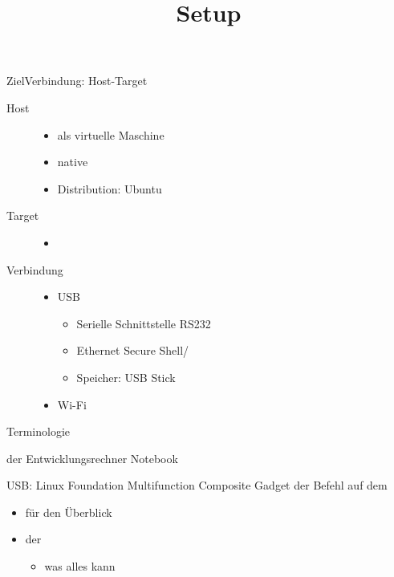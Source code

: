 \documentclass{beamer}
\title[Setup]{Setup}
\begin{document}
\frame{\titlepage}

\begin{frame}{Ziel}{Verbindung: Host-Target}
 \begin{description}
  \item[Host] \linux 
  \begin{itemize}
   \item als virtuelle Maschine
   \item native
   \item Distribution: Ubuntu
  \end{itemize}
 \item[Target]
  \begin{itemize}
   \item \beaglebone
  \end{itemize}
  \item[Verbindung] 
  \begin{itemize}
   \item USB
   \begin{itemize}
	\item Serielle Schnittstelle RS232 
	\item Ethernet  Secure Shell/
        \item Speicher: USB Stick 
   \end{itemize}
   \item Wi-Fi 
  \end{itemize}
 \end{description}
\end{frame}

\begin{frame}{Terminologie}
 \begin{description}[Target]
  \item[Host] der Entwicklungsrechner Notebook
  \item[Target] \beaglebone
 \end{description}
\end{frame}

%


\begin{frame}{USB: Linux Foundation Multifunction Composite Gadget}
             {der Befehl  auf dem \host}
  \begin{itemize}
   \item {} für den Überblick
   \item {} der \beaglebone
   \begin{itemize}
    \item {} was \beaglebone alles kann
   \end{itemize} 
  \end{itemize}
\end{frame}




\end{document}
